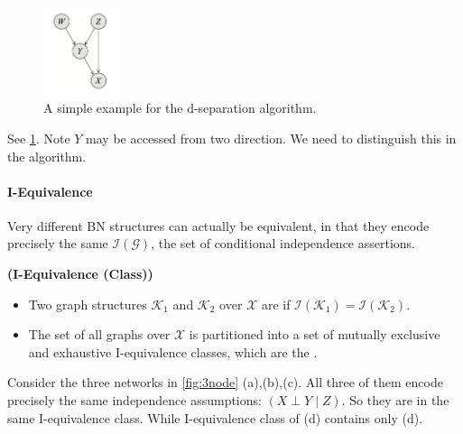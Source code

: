 \documentclass{article}
\newcommand{\bfs}[1]{\textbf{({#1}) }}
\begin{document}
\begin{exma}\label{ex:drferfecd}
\begin{figure}[H]
    \centering
    \includegraphics[width=0.2\textwidth]{Figs/a7.png}
    \caption{A simple example for the d-separation algorithm.}
    \label{fig:dsepalg}
\end{figure}
    See \cref{fig:dsepalg}. Note $Y$ may be accessed from two direction. We need to distinguish this in the algorithm.
\end{exma}

\paragraph{I-Equivalence}\label{sec:madnffe}

Very different BN structures can actually be equivalent, in that they encode precisely the same $\mathcal{I}(\mathcal{G})$, the set of conditional independence assertions.

\begin{defa}\bfs{I-Equivalence (Class)}
\begin{itemize}
    \item {} Two graph structures $\mathcal{K}_{1}$ and $\mathcal{K}_{2}$ over $\mathcal{X}$ are  if $\mathcal{I}\left(\mathcal{K}_{1}\right)=\mathcal{I}\left(\mathcal{K}_{2}\right)$. 
    \item {} The set of all graphs over $\mathcal{X}$ is partitioned into a set of mutually exclusive and exhaustive I-equivalence classes, which are the .
\end{itemize}
\end{defa}
\begin{exma}
Consider the three networks in \cref{fig:3node} (a),(b),(c). All three of them encode precisely the same independence assumptions: $(X \perp Y \mid Z)$. So they are in the same I-equivalence class. While I-equivalence class of (d) contains only (d).
\end{exma}
\end{document}
